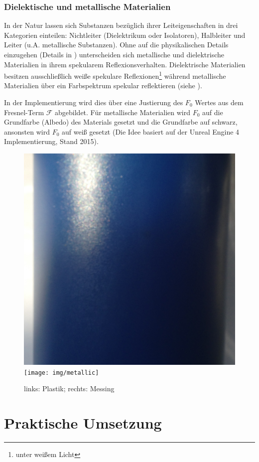 \subsubsection{Dielektische und metallische Materialien}

In der Natur lassen sich Substanzen bezüglich ihrer Leiteigenschaften in drei Kategorien einteilen: Nichtleiter (Dielektrikum oder Isolatoren), Halbleiter und Leiter (u.A. metallische Substanzen). Ohne auf die physikalischen Details einzugehen (Details in \cite[Abschnitt: Glanz und Farbe der Metalle]{Zawischa2011}) unterscheiden sich metallische und dielektrische Materialien in ihrem spekularem Reflexionsverhalten. Dielektrische Materialien besitzen ausschließlich weiße spekulare Reflexionen\footnote{unter weißem Licht} während metallische Materialien über ein Farbspektrum spekular reflektieren \parencite[Abschnitt: Specular]{Lagarde2011a}(siehe ).

In der Implementierung wird dies über eine Justierung des $F_0$ Wertes aus dem Fresnel-Term $\mathcal{F}$ abgebildet. Für metallische Materialien wird $F_0$ auf die Grundfarbe (Albedo) des Materials gesetzt und die Grundfarbe auf schwarz, ansonsten wird $F_0$ auf weiß gesetzt (Die Idee basiert auf der Unreal Engine 4 Implementierung, Stand 2015).

\begin{figure}
	\label{fig:dielectric-metallic}
	\includegraphics[width=.5\textwidth]{img/dielectric}
	\texttt{[image: img/metallic]}
	\caption[Rauheit]{links: Plastik; rechts: Messing}
\end{figure}

\section{Praktische Umsetzung}
\label{sec:pbr-umsetzung}

